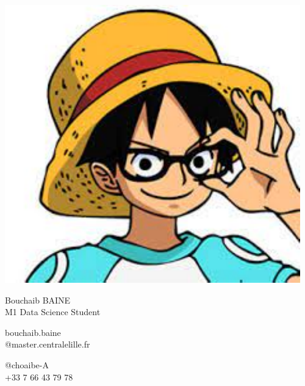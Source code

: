 \documentclass{article}
\begin{document}
\centering \includegraphics[width=0.25\linewidth]{logo}\\[5pt]
\parbox{2in}{\Large \centering  Bouchaib BAINE\\[1pt]
\normalsize M1 Data Science Student}

\vfill
\raggedright
\begin{multicols}{2}
bouchaib.baine\\
@master.centralelille.fr

\columnbreak
\raggedleft
@choaibe-A\\
+33 7 66 43 79 78%
\end{multicols}%
\end{document}
